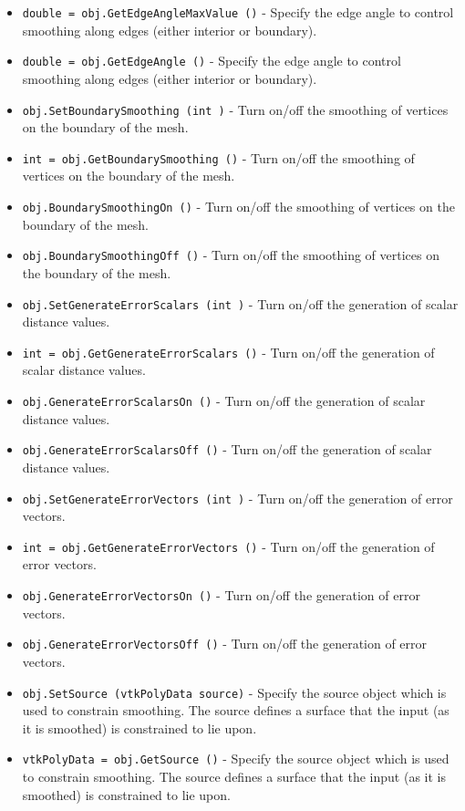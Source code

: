 \begin{itemize}
\item  \verb|double = obj.GetEdgeAngleMaxValue ()| -  Specify the edge angle to control smoothing along edges (either interior
 or boundary).

\item  \verb|double = obj.GetEdgeAngle ()| -  Specify the edge angle to control smoothing along edges (either interior
 or boundary).

\item  \verb|obj.SetBoundarySmoothing (int )| -  Turn on/off the smoothing of vertices on the boundary of the mesh.

\item  \verb|int = obj.GetBoundarySmoothing ()| -  Turn on/off the smoothing of vertices on the boundary of the mesh.

\item  \verb|obj.BoundarySmoothingOn ()| -  Turn on/off the smoothing of vertices on the boundary of the mesh.

\item  \verb|obj.BoundarySmoothingOff ()| -  Turn on/off the smoothing of vertices on the boundary of the mesh.

\item  \verb|obj.SetGenerateErrorScalars (int )| -  Turn on/off the generation of scalar distance values.

\item  \verb|int = obj.GetGenerateErrorScalars ()| -  Turn on/off the generation of scalar distance values.

\item  \verb|obj.GenerateErrorScalarsOn ()| -  Turn on/off the generation of scalar distance values.

\item  \verb|obj.GenerateErrorScalarsOff ()| -  Turn on/off the generation of scalar distance values.

\item  \verb|obj.SetGenerateErrorVectors (int )| -  Turn on/off the generation of error vectors.

\item  \verb|int = obj.GetGenerateErrorVectors ()| -  Turn on/off the generation of error vectors.

\item  \verb|obj.GenerateErrorVectorsOn ()| -  Turn on/off the generation of error vectors.

\item  \verb|obj.GenerateErrorVectorsOff ()| -  Turn on/off the generation of error vectors.

\item  \verb|obj.SetSource (vtkPolyData source)| -  Specify the source object which is used to constrain smoothing. The 
 source defines a surface that the input (as it is smoothed) is 
 constrained to lie upon.

\item  \verb|vtkPolyData = obj.GetSource ()| -  Specify the source object which is used to constrain smoothing. The 
 source defines a surface that the input (as it is smoothed) is 
 constrained to lie upon.

\end{itemize}
